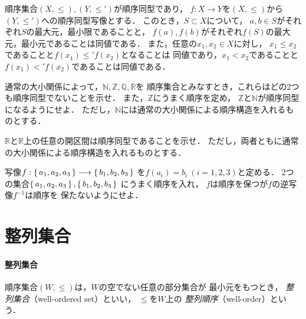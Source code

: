    順序集合$(X, {\leq}) , (Y,{\leq'})$が順序同型であり，
   $f:X \longrightarrow Y$を$(X, {\leq})$から$(Y, {\leq'})$への順序同型写像とする．
   このとき，$S \subset X$について，
   $a,b \in S$がそれぞれ$S$の最大元，最小限であることと，
   $f(a),f(b)$がそれぞれ$f(S)$の最大元，最小元であることは同値である．
   また，任意の$x_1 , x_2 \in X$に対し，
   $x_1 \leq x_2$であることと$f(x_1) \leq' f(x_2)$となることは
   同値であり，$x_1 < x_2$であることと
   $f(x_1) <' f(x_2)$であることは同値である．

   \begin{que} \label{que:NZQRdoukei}
     通常の大小関係によって，$\mathbb{N},\mathbb{Z},\mathbb{Q},\mathbb{R}$を
     順序集合とみなすとき，これらはどの2つも順序同型でないことを示せ．
     また，$\mathbb{Z}$にうまく順序を定め，
     $\mathbb{Z}$と$\mathbb{N}$が順序同型になるようにせよ．
     ただし，$\mathbb{N}$には通常の大小関係による順序構造を入れるものとする．
   \end{que}


   \begin{que} \label{que:Rkaikukanjunjo}
     $\mathbb{R}$と$\mathbb{R}$上の任意の開区間は順序同型であることを示せ．
     ただし，両者ともに通常の大小関係による順序構造を入れるものとする．
   \end{que}

   \begin{que} \label{que:doukeigyaku}
     写像$f: \set{a_1, a_2, a_3} \longrightarrow 
     \set{b_1, b_2, b_3} $
     を$f(a_i) = b_i \ (i =1,2,3)$と定める．
     2つの集合$\set{ a_1,a_2,a_3}, \set{b_1,b_2,b_3}$
     にうまく順序を入れ，
     $f$は順序を保つが$f$の逆写像$f^{-1}$は順序を
     保たないようにせよ．
   \end{que}





%

 \section{整列集合}
 \label{sec:choice}


  \paragraph{整列集合}
   順序集合$(W, {\leq})$は，$W$の空でない任意の部分集合が
   最小元をもつとき，
   \emph{整列集合}（well-ordered set）といい，
   $\leq$を$W$上の
   \emph{整列順序}（well-order）という．
   

